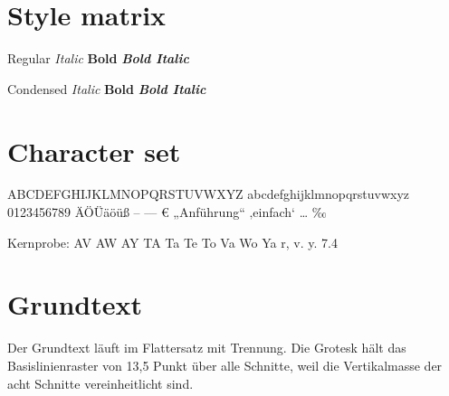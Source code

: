 \documentclass{swisstex}
\begin{document}
\section{Style matrix}
Regular \textit{Italic} \textbf{Bold} \textbf{\textit{Bold Italic}}\par
{\condensed Condensed \textit{Italic} \textbf{Bold} \textbf{\textit{Bold Italic}}}
\section{Character set}
ABCDEFGHIJKLMNOPQRSTUVWXYZ abcdefghijklmnopqrstuvwxyz
0123456789 ÄÖÜäöüß – — € „Anführung“ ‚einfach` … ‰\par
Kernprobe: AV AW AY TA Ta Te To Va Wo Ya r, v. y. 7.4
\section{Grundtext}
Der Grundtext läuft im Flattersatz mit Trennung. Die Grotesk hält das
Basislinienraster von 13,5 Punkt über alle Schnitte, weil die
Vertikalmasse der acht Schnitte vereinheitlicht sind.
\end{document}
